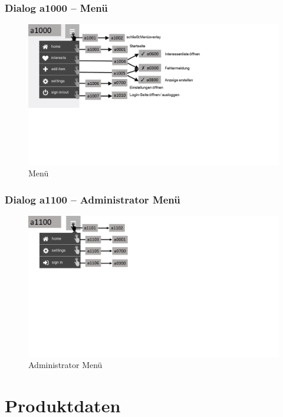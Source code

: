 \documentclass[a4paper,12pt,oneside]{scrartcl}
\begin{document}
\subsubsection{Dialog a1000 – Menü}
\begin{figure}[!htbp]
\centering
\noindent\includegraphics[width=\linewidth,height=\textheight,keepaspectratio]{Dialoge/a1000}
\caption{Menü}
\end{figure}
\FloatBarrier

\subsubsection{Dialog a1100 – Administrator Menü}
\begin{figure}[!htbp]
\centering
\noindent\includegraphics[width=\linewidth,height=\textheight,keepaspectratio]{Dialoge/a1100}
\caption{Administrator Menü}
\end{figure}
\FloatBarrier



\section{Produktdaten}
\end{document}

